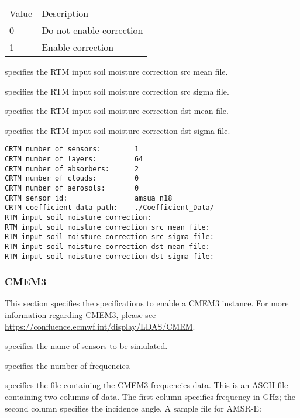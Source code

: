  \begin{tabular}{ll}
 Value & Description              \\
 0     & Do not enable correction \\
 1     & Enable correction        \\
 \end{tabular}

  specifies
 the RTM input soil moisture correction src mean file.

  specifies
 the RTM input soil moisture correction src sigma file.

  specifies
 the RTM input soil moisture correction dst mean file.

  specifies
 the RTM input soil moisture correction dst sigma file.
 

 \begin{Verbatim}[frame=single]
CRTM number of sensors:        1
CRTM number of layers:         64
CRTM number of absorbers:      2
CRTM number of clouds:         0 
CRTM number of aerosols:       0 
CRTM sensor id:                amsua_n18  
CRTM coefficient data path:    ./Coefficient_Data/
RTM input soil moisture correction:
RTM input soil moisture correction src mean file:
RTM input soil moisture correction src sigma file:
RTM input soil moisture correction dst mean file:
RTM input soil moisture correction dst sigma file:
 \end{Verbatim}

 
 \subsubsection{CMEM3} \label{ssec:cmem3}
 This section specifies the specifications to enable a CMEM3 instance.
 For more information regarding CMEM3, please see \\
 \hyperref{https://confluence.ecmwf.int/display/LDAS/CMEM}{}{}{https://confluence.ecmwf.int/display/LDAS/CMEM}.

  specifies the name of sensors to be simulated.

  specifies the number of
 frequencies.

  specifies the file
 containing the CMEM3 frequencies data.
 This is an ASCII file containing two columns of data.
 The first column specifies frequency in GHz; the second column
 specifies the incidence angle.  A sample file for AMSR-E:

